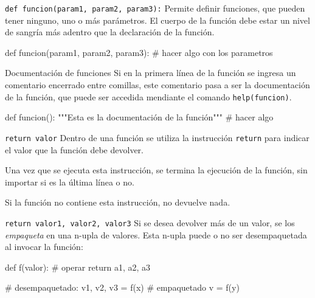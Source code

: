 \begin{referencia_python}

\begin{sintaxis}{\lstinline!def funcion(param1, param2, param3):!}
Permite definir funciones, que pueden tener ninguno, uno o más
parámetros.  El cuerpo de la función debe estar un nivel de sangría
más adentro que la declaración de la función.

\begin{codigo-python-sn}
def funcion(param1, param2, param3):
    # hacer algo con los parametros
\end{codigo-python-sn}
\end{sintaxis}

\begin{sintaxis}{Documentación de funciones}
Si en la primera línea de la función se ingresa un comentario
encerrado entre comillas, este comentario pasa a ser la documentación
de la función, que puede ser accedida mendiante el comando
\lstinline!help(funcion)!.
\begin{codigo-python-sn}
def funcion():
    """Esta es la documentación de la función"""
    # hacer algo
\end{codigo-python-sn}
\end{sintaxis}

\begin{sintaxis}{\lstinline!return valor!}
Dentro de una función se utiliza la instrucción \lstinline!return!
para indicar el valor que la función debe devolver.

Una vez que se ejecuta esta instrucción, se termina la ejecución de la
función, sin importar si es la última línea o no.

Si la función no contiene esta instrucción, no devuelve nada.
\end{sintaxis}

\begin{sintaxis}{\lstinline!return valor1, valor2, valor3!}
Si se desea devolver más de un valor, se los {\em empaqueta} en
una n-upla de valores.  Esta n-upla puede o no ser desempaquetada al
invocar la función:
\begin{codigo-python-sn}
def f(valor):
    # operar
    return a1, a2, a3

# desempaquetado:
v1, v2, v3 = f(x)
# empaquetado
v = f(y)
\end{codigo-python-sn}
\end{sintaxis}

\end{referencia_python}

